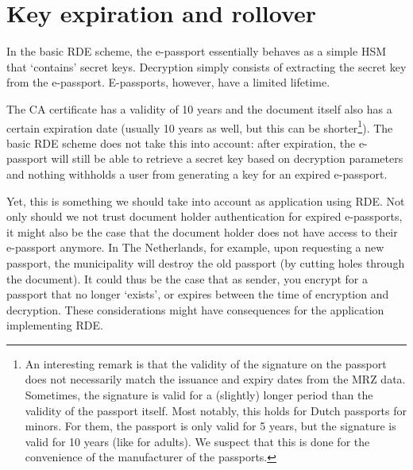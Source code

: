 \section{Key expiration and rollover}\label{sec:key-expiration-and-rollover}
In the basic RDE scheme, the e-passport essentially behaves as a simple HSM that `contains' secret keys.
Decryption simply consists of extracting the secret key from the e-passport.
E-passports, however, have a limited lifetime.

The CA certificate has a validity of 10 years and the document itself also has a certain expiration date (usually 10 years as well, but this can be shorter\footnote{
    An interesting remark is that the validity of the signature on the passport does not necessarily match the issuance and expiry dates from the MRZ data.
    Sometimes, the signature is valid for a (slightly) longer period than the validity of the passport itself.
    Most notably, this holds for Dutch passports for minors.
    For them, the passport is only valid for 5 years, but the signature is valid for 10 years (like for adults).
    We suspect that this is done for the convenience of the manufacturer of the passports.
}).
The basic RDE scheme does not take this into account: after expiration, the e-passport will still be able to retrieve a secret key based on decryption parameters and nothing withholds a user from generating a key for an expired e-passport.

Yet, this is something we should take into account as application using RDE.
Not only should we not trust document holder authentication for expired e-passports, it might also be the case that the document holder does not have access to their e-passport anymore.
In The Netherlands, for example, upon requesting a new passport, the municipality will destroy the old passport (by cutting holes through the document).
It could thus be the case that as sender, you encrypt for a passport that no longer `exists', or expires between the time of encryption and decryption.
These considerations might have consequences for the application implementing RDE.
